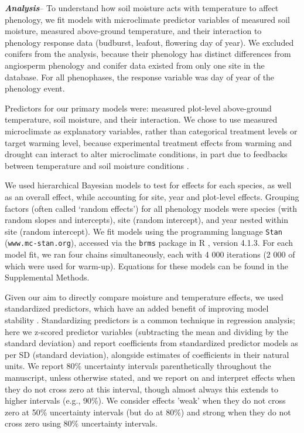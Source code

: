 \documentclass{article}
\begin{document}
\par\textbf {\emph{Analysis}}--
To understand how soil moisture acts with temperature to affect phenology, we fit models with microclimate predictor variables of measured soil moisture, measured above-ground temperature, and their interaction to phenology response data (budburst, leafout, flowering day of year). We excluded conifers from the analysis, because their phenology has distinct differences from angiosperm phenology \cite[e.g., with budburst occuring later in the season]{polgar2014} and conifer data existed from only one site in the database. For all phenophases, the response variable was day of year of the phenology event. 

\par Predictors for our primary models were: measured plot-level above-ground temperature, soil moisture, and their interaction. We chose to use measured microclimate as explanatory variables, rather than categorical treatment levels or target warming level, because experimental treatment effects from warming and drought can interact to alter microclimate conditions, in part due to feedbacks between temperature and soil moisture conditions \citep{ettinger2019,mcdaniel2014}.
 
\par We used hierarchical Bayesian models to test for effects for each species, as well as an overall effect, while accounting for site, year and plot-level effects. Grouping factors (often called `random effects') for all phenology models were species (with random slopes and intercepts), site (random intercept), and year nested within site (random intercept). We fit models using the programming language \texttt{Stan} \citep{Carpenter:2016aa} (\texttt{www.mc-stan.org}), accessed via the \texttt{brms} \citep{burkner2021} package in R \citep{rcoreteam2022}, version 4.1.3. For each model fit, we ran four chains simultaneously, each with 4 000 iterations (2 000 of which were used for warm-up). Equations for these models can be found in the Supplemental Methods. 

\par Given our aim to directly compare moisture and temperature effects, we used standardized predictors, which have an added benefit of improving model stability \citep{gelman2007}. Standardizing predictors is a common technique in regression analysis; here we z-scored predictor variables (subtracting the mean and dividing by the standard deviation) and report coefficients from standardized predictor models as per SD (standard deviation), alongside estimates of coefficients in their natural units. We report 80\% uncertainty intervals parenthetically throughout the manuscript, unless otherwise stated, and we report on and interpret effects when they do not cross zero at this interval, though almost always this extends to higher intervals (e.g., 90\%). We consider effects 'weak' when they do not cross zero at 50\% uncertainty intervals (but do at 80\%) and strong when they do not cross zero using 80\% uncertainty intervals.
\end{document}
